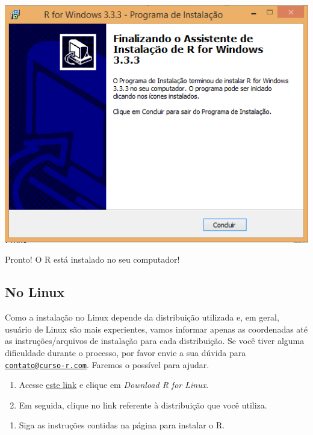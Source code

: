 \documentclass[
]{book}
\providecommand{\tightlist}{%
  \setlength{\itemsep}{0pt}\setlength{\parskip}{0pt}}
\begin{document}
\begin{center}\includegraphics[width=7.11in]{img/instalacao/09-conclusao} \end{center}

Pronto! O R está instalado no seu computador!

\hypertarget{no-linux}{%
\subsection{No Linux}\label{no-linux}}

Como a instalação no Linux depende da distribuição utilizada e, em geral, usuário de Linux são mais experientes, vamos informar apenas as coordenadas até as instruções/arquivos de instalação para cada distribuição. Se você tiver alguma dificuldade durante o processo, por favor envie a sua dúvida para \href{mailto:contato@curso-r.com}{\nolinkurl{contato@curso-r.com}}. Faremos o possível para ajudar.

\begin{enumerate}
\def\labelenumi{\arabic{enumi}.}
\item
  Acesse \href{https://cran.r-project.org/}{este link} e clique em \emph{Download R for Linux}.
\item
  Em seguida, clique no link referente à distribuição que você utiliza.
\end{enumerate}

\begin{enumerate}
\def\labelenumi{\arabic{enumi}.}
\setcounter{enumi}{2}
\tightlist
\item
  Siga as instruções contidas na página para instalar o R.
\end{enumerate}
\end{document}
